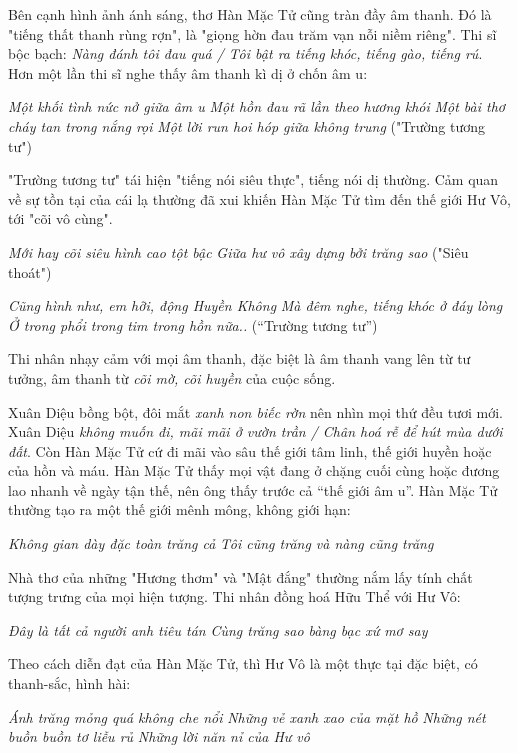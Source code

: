 \documentclass[../main.tex]{subfiles}
\begin{document}
\begin{multicols}{2}
Bên cạnh hình ảnh ánh sáng, thơ Hàn Mặc Tử cũng tràn đầy âm thanh. Đó là "tiếng thất thanh rùng rợn", là "giọng hờn đau trăm vạn nỗi niềm riêng". Thi sĩ bộc bạch: \textit{Nàng đánh tôi đau quá / Tôi bật ra tiếng khóc, tiếng gào, tiếng rú}. Hơn một lần thi sĩ nghe thấy âm thanh kì dị ở chốn âm u:  
 
\textit{Một khối tình nức nở giữa âm u} 
\textit{Một hồn đau rã lần theo hương khói} 
\textit{Một bài thơ cháy tan trong nắng rọi} 
\textit{Một lời run hoi hóp giữa không trung} 
("Trường tương tư") 
 
"Trường tương tư" tái hiện "tiếng nói siêu thực", tiếng nói dị thường. Cảm quan về sự tồn tại của cái lạ thường đã xui khiến Hàn Mặc Tử tìm đến thế giới Hư Vô, tới "cõi vô cùng".   
 
\textit{Mới hay cõi siêu hình cao tột bậc} 
\textit{Giữa hư vô xây dựng bởi trăng sao} 
("Siêu thoát") 
 
\textit{Cũng hình như, em hỡi, động Huyền Không} 
\textit{Mà đêm nghe, tiếng khóc ở đáy lòng} 
\textit{Ở trong phổi trong tim trong hồn nữa..} 
(“Trường tương tư”) 
 
Thi nhân nhạy cảm với mọi âm thanh, đặc biệt là âm thanh vang lên từ tư tưởng, âm thanh từ \textit{cõi mờ, cõi huyền} của cuộc sống.  
   
Xuân Diệu bồng bột, đôi mắt \textit{xanh non biếc rờn }nên nhìn mọi thứ đều tươi mới. Xuân Diệu \textit{không muốn đi, mãi mãi ở vườn trần / Chân hoá rễ để hút mùa dưới đất}. Còn Hàn Mặc Tử cứ đi mãi vào sâu thế giới tâm linh, thế giới huyền hoặc của hồn và máu. Hàn Mặc Tử thấy mọi vật đang ở chặng cuối cùng hoặc đương lao nhanh về ngày tận thế, nên ông thấy trước cả “thế giới âm u”. Hàn Mặc Tử  thường tạo ra một thế giới mênh mông, không giới hạn: 
 
\textit{Không gian dày đặc toàn trăng cả } 
\textit{Tôi cũng trăng và nàng cũng trăng} 
 
Nhà thơ của những "Hương thơm" và "Mật đắng" thường nắm lấy tính chất tượng trưng của mọi hiện tượng. Thi nhân đồng hoá Hữu Thể với Hư Vô: 
 
\textit{Đây là tất cả người anh tiêu tán} 
\textit{Cùng trăng sao bàng bạc xứ mơ say } 
 
Theo cách diễn đạt của Hàn Mặc Tử, thì Hư Vô là một thực tại đặc biệt, có thanh-sắc, hình hài:   
 
\textit{Ánh trăng mỏng quá không che nổi} 
\textit{Những vẻ xanh xao của mặt hồ} 
\textit{Những nét buồn buồn tơ liễu rủ } 
\textit{Những lời năn nỉ của Hư vô  } 
 

\end{multicols}
\end{document}
